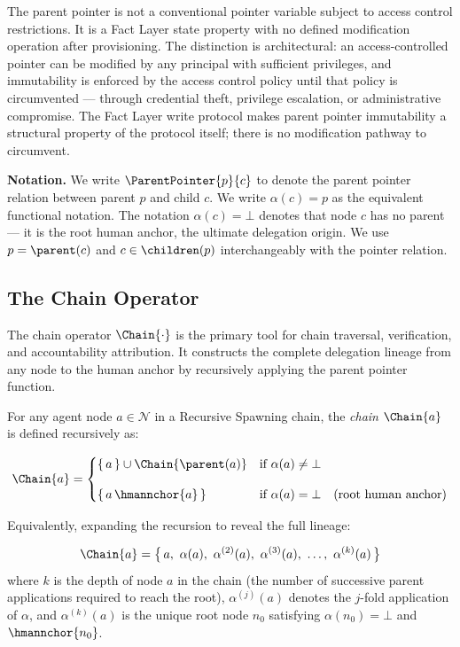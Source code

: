 The parent pointer is not a conventional pointer variable subject to access control restrictions. It is a Fact Layer state property with no defined modification operation after provisioning. The distinction is architectural: an access-controlled pointer can be modified by any principal with sufficient privileges, and immutability is enforced by the access control policy until that policy is circumvented --- through credential theft, privilege escalation, or administrative compromise. The Fact Layer write protocol makes parent pointer immutability a structural property of the protocol itself; there is no modification pathway to circumvent.

\bigskip
\noindent\textbf{Notation.} We write $\ParentPointer{p}{c}$ to denote the parent pointer relation between parent $p$ and child $c$. We write $\alpha(c) = p$ as the equivalent functional notation. The notation $\alpha(c) = \bot$ denotes that node $c$ has no parent --- it is the root human anchor, the ultimate delegation origin. We use $p = \parent(c)$ and $c \in \children(p)$ interchangeably with the pointer relation.

\subsection{The Chain Operator}
\label{sec:chain-operator-definition}

The chain operator $\Chain{\cdot}$ is the primary tool for chain traversal, verification, and accountability attribution. It constructs the complete delegation lineage from any node to the human anchor by recursively applying the parent pointer function.

\begin{definition}
\label{def:chain-operator}
For any agent node $a \in \mathcal{N}$ in a Recursive Spawning chain, the \emph{chain} $\Chain{a}$ is defined recursively as:

\begin{equation}
\Chain{a} =
\begin{cases}
\{\,a\,\} \cup \Chain{\parent(a)} & \text{if } \alpha(a) \neq \bot \\[10pt]
\{\,a\,\hmannchor{a}\,\} & \text{if } \alpha(a) = \bot \quad \text{(root human anchor)}
\end{cases}
\label{eq:chain-recursive}
\end{equation}

Equivalently, expanding the recursion to reveal the full lineage:

\begin{equation}
\Chain{a} = \bigl\{\, a,\ \alpha(a),\ \alpha^{(2)}(a),\ \alpha^{(3)}(a),\ \ldots,\ \alpha^{(k)}(a) \,\bigr\}
\label{eq:chain-expanded}
\end{equation}
where $k$ is the depth of node $a$ in the chain (the number of successive parent applications required to reach the root), $\alpha^{(j)}(a)$ denotes the $j$-fold application of $\alpha$, and $\alpha^{(k)}(a)$ is the unique root node $n_0$ satisfying $\alpha(n_0) = \bot$ and $\hmannchor{n_0}$.
\end{definition}

